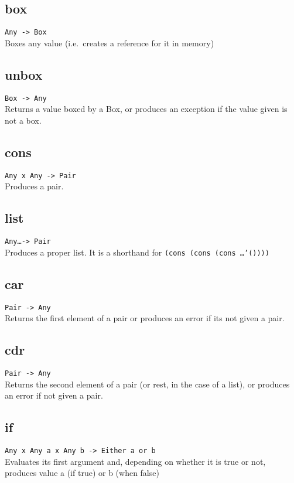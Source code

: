 \subsection*{box}
\texttt{Any -> Box}\\
\noindent Boxes any value (i.e.\ creates a reference for it in memory)

\subsection*{unbox}
\texttt{Box -> Any}\\
\noindent Returns a value boxed by a Box, or produces an exception if the value given is not a box.

\subsection*{cons}
\texttt{Any x Any -> Pair}\\
\noindent Produces a pair.

\subsection*{list}
\texttt{Any\ldots -> Pair}\\
\noindent Produces a proper list. It is a shorthand for \texttt{(cons (cons (cons \ldots '())))}

\subsection*{car}
\texttt{Pair -> Any}\\
\noindent Returns the first element of a pair or produces an error if its not given a pair.

\subsection*{cdr}
\texttt{Pair -> Any}\\
\noindent Returns the second element of a pair (or rest, in the case of a list), or produces an error if not
given a pair.

\subsection*{if}
\texttt{Any x Any a x Any b -> Either a or b}\\
\noindent Evaluates its first argument and, depending on whether it is true or not, produces value a (if true)
or b (when false)

